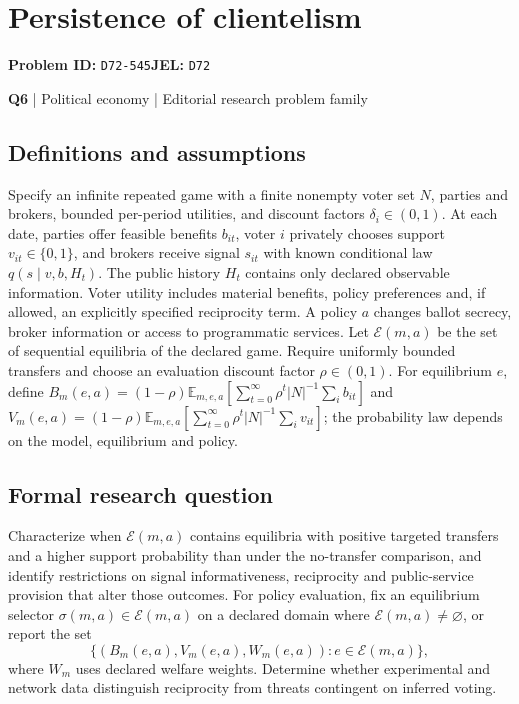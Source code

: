 \documentclass[11pt,a4paper]{article}
\begin{document}
\section*{Persistence of clientelism}
\textbf{Problem ID:} \texttt{D72-545}\quad \textbf{JEL:} \texttt{D72}\par
\label{problem:OP-0126}
\label{atlas:prob:Q6}
{\sffamily\small\color{muted}\textbf{Q6} | Political economy | Editorial research problem family\par}
\subsection*{Definitions and assumptions}
Specify an infinite repeated game with a finite nonempty voter set $N$, parties and brokers, bounded per-period utilities, and discount factors $\delta_i\in(0,1)$. At each date, parties offer feasible benefits $b_{it}$, voter $i$ privately chooses support $v_{it}\in\{0,1\}$, and brokers receive signal $s_{it}$ with known conditional law $q(s\mid v,b,H_t)$. The public history $H_t$ contains only declared observable information. Voter utility includes material benefits, policy preferences and, if allowed, an explicitly specified reciprocity term. A policy $a$ changes ballot secrecy, broker information or access to programmatic services. Let $\mathcal E(m,a)$ be the set of sequential equilibria of the declared game. Require uniformly bounded transfers and choose an evaluation discount factor $\rho\in(0,1)$. For equilibrium $e$, define $B_m(e,a)=(1-\rho)\mathbb E_{m,e,a}[\sum_{t=0}^{\infty}\rho^t |N|^{-1}\sum_i b_{it}]$ and $V_m(e,a)=(1-\rho)\mathbb E_{m,e,a}[\sum_{t=0}^{\infty}\rho^t |N|^{-1}\sum_i v_{it}]$; the probability law depends on the model, equilibrium and policy.
\subsection*{Formal research question}
Characterize when $\mathcal E(m,a)$ contains equilibria with positive targeted transfers and a higher support probability than under the no-transfer comparison, and identify restrictions on signal informativeness, reciprocity and public-service provision that alter those outcomes. For policy evaluation, fix an equilibrium selector $\sigma(m,a)\in\mathcal E(m,a)$ on a declared domain where $\mathcal E(m,a)\ne\varnothing$, or report the set
\[
\{(B_m(e,a),V_m(e,a),W_m(e,a)):e\in\mathcal E(m,a)\},
\]
where $W_m$ uses declared welfare weights. Determine whether experimental and network data distinguish reciprocity from threats contingent on inferred voting.
\end{document}
